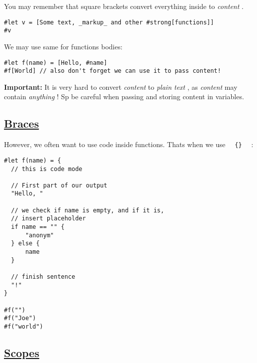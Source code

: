 You may remember that square brackets convert everything inside to
\emph{content} .

\begin{verbatim}
#let v = [Some text, _markup_ and other #strong[functions]]
#v
\end{verbatim}

\pandocbounded{}

We may use same for functions bodies:

\begin{verbatim}
#let f(name) = [Hello, #name]
#f[World] // also don't forget we can use it to pass content!
\end{verbatim}

\pandocbounded{}

\textbf{Important:} It is very hard to convert \emph{content} to
\emph{plain text} , as \emph{content} may contain \emph{anything} ! Sp
be careful when passing and storing content in variables.

\subsection{\texorpdfstring{\hyperref[braces]{Braces}}{Braces}}\label{braces}

However, we often want to use code inside functions.
That\textquotesingle s when we use
\texttt{\ }{\texttt{\ \{\}\ }}\texttt{\ } :

\begin{verbatim}
#let f(name) = {
  // this is code mode

  // First part of our output
  "Hello, "

  // we check if name is empty, and if it is,
  // insert placeholder
  if name == "" {
      "anonym"
  } else {
      name
  }

  // finish sentence
  "!"
}

#f("")
#f("Joe")
#f("world")
\end{verbatim}

\pandocbounded{}

\subsection{\texorpdfstring{\hyperref[scopes]{Scopes}}{Scopes}}\label{scopes}

